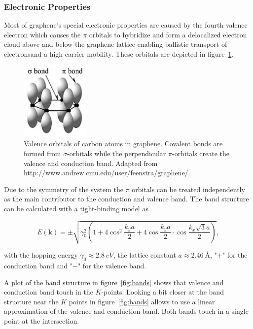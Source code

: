 \newpage

\subsubsection{Electronic Properties}

Most of graphene's special electronic properties are caused by the fourth valence electron which causes the $\pi$ orbitals to hybridize and form a delocalized electron cloud above and below the graphene lattice enabling ballistic transport of electrons\mcite and a high carrier mobility\mcite. These orbitals are depicted in figure~\ref{fig:orbitals}.

\begin{figure}[!h]
  \centering
  \includegraphics[width=0.3\textwidth]{./images/orbitals.jpg}
  \caption{Valence orbitals of carbon atoms in graphene. Covalent bonds are formed from $\sigma$-orbitals while the perpendicular $\pi$-orbitals create the valence and conduction band. Adapted from http://www.andrew.cmu.edu/user/feenstra/graphene/\mcite. }
  \label{fig:orbitals}
\end{figure}

Due to the symmetry of the system the $\pi$ orbitals can be treated independently as the main contributor to the conduction and valence band. The band structure can be calculated with a tight-binding model as\mcite

\begin{equation}
  E(\mathbf{k})=\pm\sqrt{\gamma_0^2\left(1+4\cos^2\frac{k_ya}{2}+4\cos\frac{k_ya}{2}\cdot\cos\frac{k_x\sqrt{3}a}{2}\right)},
  \label{eq:dispersion}
\end{equation}

with the hopping energy $\gamma_0\approx\SI{2.8}{eV}$\mcite, the lattice constant $a\approx\SI{2.46}{Å}$, "$+$" for the conduction band and "$-$" for the valence band.

A plot of the band structure in figure~\ref{fig:bands} shows that valence and conduction band touch in the $K$-points. Looking a bit closer at the band structure near the $K$ points in figure~\ref{fig:bands} allows to use a linear approximation of the valence and conduction band. Both bands touch in a single point at the intersection.


